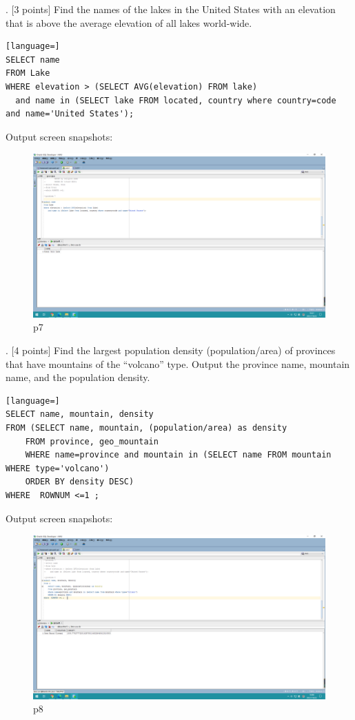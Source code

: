 \documentclass[]{article}
\begin{document}
	. [3 points] Find the names of the lakes in the United States with an elevation that is above the average elevation of all lakes world-wide.\\
	
	\begin{lstlisting}[language=] 
SELECT name
FROM Lake
WHERE elevation > (SELECT AVG(elevation) FROM lake) 
  and name in (SELECT lake FROM located, country where country=code and name='United States');
	\end{lstlisting} 
	Output screen snapshots:
	\begin{figure}[H]
		\centering
		\includegraphics[width=0.9\linewidth]{../screen/p7}
		\caption{p7}
		\label{fig:p7}
	\end{figure}
	
	. [4 points] Find the largest population density (population/area) of provinces that have mountains of the “volcano” type. Output the province name, mountain name, and the population density.  \\
	
	\begin{lstlisting}[language=] 
SELECT name, mountain, density 
FROM (SELECT name, mountain, (population/area) as density
	FROM province, geo_mountain
	WHERE name=province and mountain in (SELECT name FROM mountain WHERE type='volcano')
	ORDER BY density DESC)
WHERE  ROWNUM <=1 ; 
	\end{lstlisting} 
	Output screen snapshots:
	\begin{figure}[H]
		\centering
		\includegraphics[width=1\linewidth]{../screen/p8}
		\caption{p8}
		\label{fig:p8}
	\end{figure}
	
\end{document}
